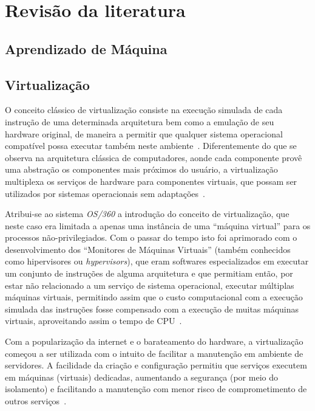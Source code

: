 %
%

\chapter{Revisão da literatura}

\section{Aprendizado de Máquina}\label{sec:aprendizado}



\section{Virtualização}\label{sec:virt}

O conceito clássico de virtualização consiste na execução simulada de cada
instrução de uma determinada arquitetura bem como a emulação de seu
hardware original, de maneira a permitir que qualquer sistema operacional
compatível possa executar também neste ambiente~\cite{goldberg1974survey}.
Diferentemente do que se observa na arquitetura clássica de computadores,
aonde cada componente provê uma abstração os componentes mais próximos do
usuário, a virtualização multiplexa os serviços de hardware para
componentes virtuais, que possam ser utilizados por sistemas operacionais
sem adaptações~\cite{dutra2009a}.


Atribui-se ao sistema \emph{OS/360} a introdução do conceito de
virtualização, que neste caso era limitada a apenas uma instância de uma
``máquina virtual'' para os processos não-privilegiados. Com o passar do
tempo isto foi aprimorado com o desenvolvimento dos ``Monitores de
Máquinas Virtuais'' (também conhecidos como hipervisores ou
\emph{hypervisors}), que eram softwares especializados em executar um
conjunto de instruções de alguma arquitetura e que permitiam então, por
estar não relacionado a um serviço de sistema operacional, executar
múltiplas máquinas virtuais, permitindo assim que o custo computacional com
a execução simulada das instruções fosse compensado com a execução de
muitas máquinas virtuais, aproveitando assim o tempo de
CPU~\cite{goldberg1974survey}.

Com a popularização da internet e o barateamento do hardware, a
virtualização começou a ser utilizada com o intuito de facilitar a
manutenção em ambiente de servidores. A facilidade da criação e
configuração permitiu que serviços executem em máquinas (virtuais)
dedicadas, aumentando a segurança (por meio do isolamento) e facilitando a
manutenção com menor risco de comprometimento de outros
serviços~\cite{smith2005architecture}.

